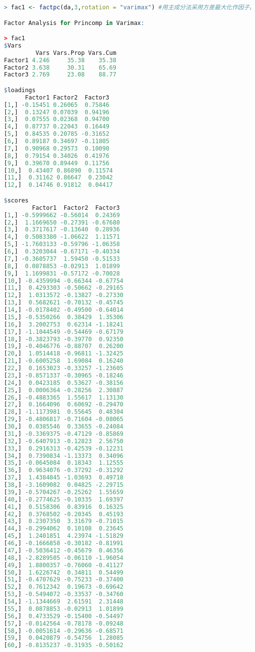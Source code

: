 \documentclass[11pt,a4paper,oneside]{book}
\begin{document}
\begin{lstlisting}[language=r]
> fac1 <- factpc(da,3,rotation = "varimax") #用主成分法采用方差最大化作因子正交旋转

Factor Analysis for Princomp in Varimax: 

> fac1
$Vars
         Vars Vars.Prop Vars.Cum
Factor1 4.246     35.38    35.38
Factor2 3.638     30.31    65.69
Factor3 2.769     23.08    88.77

$loadings
      Factor1 Factor2  Factor3
[1,] -0.15451 0.26065  0.75846
[2,]  0.13247 0.07039  0.94196
[3,]  0.07555 0.02368  0.94700
[4,]  0.87737 0.22043  0.16449
[5,]  0.84535 0.20785 -0.31652
[6,]  0.89187 0.34697 -0.11805
[7,]  0.90968 0.29573  0.10090
[8,]  0.79154 0.34026  0.41976
[9,]  0.39670 0.89449  0.11756
[10,]  0.43407 0.86890  0.11574
[11,]  0.31162 0.86647  0.23042
[12,]  0.14746 0.91812  0.04417

$scores
        Factor1  Factor2  Factor3
[1,] -0.5999662 -0.56014  0.24369
[2,]  1.1669650 -0.27391 -0.67680
[3,]  0.3717617 -0.13640  0.28936
[4,]  0.5083380 -1.06622  1.11571
[5,] -1.7603133 -0.59796 -1.06358
[6,]  0.3203044 -0.67171 -0.40334
[7,] -0.3605737  1.59450 -0.51533
[8,]  0.0878853 -0.02913  1.01899
[9,]  1.1699831 -0.57172 -0.70028
[10,] -0.4359994 -0.66344 -0.67754
[11,]  0.4293303 -0.50662 -0.29165
[12,]  1.0313572 -0.13827 -0.27330
[13,]  0.5682621 -0.70132 -0.45745
[14,] -0.0178402 -0.49500 -0.64014
[15,] -0.5350266  0.38429  1.35306
[16,]  3.2002753  0.62314 -1.18241
[17,] -1.1044549 -0.54469 -0.67179
[18,] -0.3823793 -0.39770  0.92350
[19,] -0.4046776 -0.88707  0.26200
[20,]  1.0514418 -0.96811 -1.32425
[21,] -0.6005258  1.69084  0.16240
[22,]  0.1653023 -0.33257 -1.23605
[23,] -0.8571337 -0.30965 -0.18246
[24,]  0.0423185  0.53627 -0.38156
[25,]  0.0006364 -0.28256  2.30887
[26,] -0.4883365  1.55617  1.13130
[27,]  0.1664096  0.60692 -0.29470
[28,] -1.1173981  0.55645  0.48304
[29,] -0.4806817 -0.71604 -0.08065
[30,]  0.0385546  0.33655 -0.24084
[31,] -0.3369375 -0.47129 -0.85869
[32,] -0.6407913 -0.12823  2.56750
[33,]  0.2916313 -0.42539 -0.12231
[34,]  0.7390834 -1.13373  0.34096
[35,] -0.0645084  0.18343  1.12555
[36,]  0.9634076 -0.37292 -0.31292
[37,]  1.4384845 -1.03693  0.49718
[38,] -3.1609082  0.04825 -2.29715
[39,] -0.5704267 -0.25262  1.55659
[40,] -0.2774625 -0.10335  1.69397
[41,]  0.5158306  0.83916  0.16325
[42,]  0.3768502 -0.20345  0.45193
[43,]  0.2307350  3.31679 -0.71015
[44,] -0.2994062  0.10108  0.23645
[45,]  1.2401851  4.23974 -1.51829
[46,] -0.1666858 -0.30182 -0.81991
[47,] -0.5036412 -0.45679  0.46356
[48,] -2.8289505 -0.06110 -1.96054
[49,]  1.8800357 -0.76060 -0.41127
[50,]  1.6226742  0.34811  0.54499
[51,] -0.4707629 -0.75233 -0.37400
[52,]  0.7612342  0.19673 -0.69642
[53,] -0.5494072 -0.33537 -0.34760
[54,] -1.1344669  2.61591  2.31448
[55,]  0.0878853 -0.02913  1.01899
[56,]  0.4733529 -0.15400 -0.54497
[57,] -0.0142564 -0.78178 -0.09248
[58,] -0.0051614 -0.29636 -0.68571
[59,]  0.0420879 -0.54756  1.28085
[60,] -0.8135237 -0.31935 -0.50162


\end{lstlisting}
\end{document}

